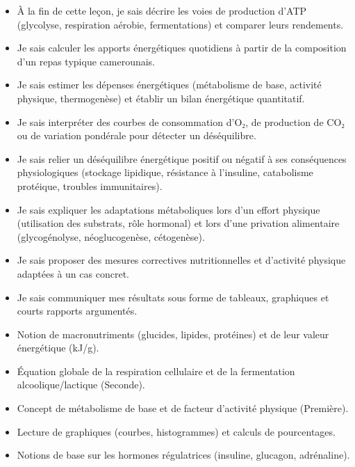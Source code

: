 \documentclass[11pt]{article}
\begin{document}
\begin{objectifs}
\begin{itemize}
\item À la fin de cette leçon, je sais décrire les voies de production d'ATP (glycolyse, respiration aérobie, fermentations) et comparer leurs rendements.
\item Je sais calculer les apports énergétiques quotidiens à partir de la composition d'un repas typique camerounais.
\item Je sais estimer les dépenses énergétiques (métabolisme de base, activité physique, thermogenèse) et établir un bilan énergétique quantitatif.
\item Je sais interpréter des courbes de consommation d'O₂, de production de CO₂ ou de variation pondérale pour détecter un déséquilibre.
\item Je sais relier un déséquilibre énergétique positif ou négatif à ses conséquences physiologiques (stockage lipidique, résistance à l'insuline, catabolisme protéique, troubles immunitaires).
\item Je sais expliquer les adaptations métaboliques lors d'un effort physique (utilisation des substrats, rôle hormonal) et lors d'une privation alimentaire (glycogénolyse, néoglucogenèse, cétogenèse).
\item Je sais proposer des mesures correctives nutritionnelles et d'activité physique adaptées à un cas concret.
\item Je sais communiquer mes résultats sous forme de tableaux, graphiques et courts rapports argumentés.
\end{itemize}
\end{objectifs}

\begin{prerequis}
\begin{itemize}
\item Notion de macronutriments (glucides, lipides, protéines) et de leur valeur énergétique (kJ/g).
\item Équation globale de la respiration cellulaire et de la fermentation alcoolique/lactique (Seconde).
\item Concept de métabolisme de base et de facteur d'activité physique (Première).
\item Lecture de graphiques (courbes, histogrammes) et calculs de pourcentages.
\item Notions de base sur les hormones régulatrices (insuline, glucagon, adrénaline).
\end{itemize}
\end{prerequis}
\end{document}
